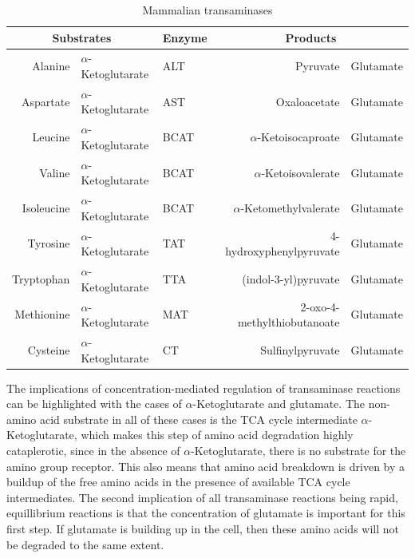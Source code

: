 \documentclass{tufte-handout}
\begin{document}
\begin{table}[b]
\centering
\caption{Mammalian transaminases}
\label{tab:transaminases}
\begin{tabular}{@{}rllrl@{}}
\toprule
\multicolumn{2}{c}{\textbf{Substrates}} & \textbf{Enzyme} & \multicolumn{2}{c}{\textbf{Products}}   \\ \midrule
Alanine          & $\alpha$-Ketoglutarate      & ALT             & Pyruvate                    & Glutamate \\
Aspartate        & $\alpha$-Ketoglutarate      & AST             & Oxaloacetate                & Glutamate \\
Leucine          & $\alpha$-Ketoglutarate      & BCAT\nomenclature{BCAT}{Branched-Chain Aminotransferase}\index{Enzymes!BCAT}            & $\alpha$-Ketoisocaproate           & Glutamate \\
Valine           & $\alpha$-Ketoglutarate      & BCAT            & $\alpha$-Ketoisovalerate           & Glutamate \\
Isoleucine       & $\alpha$-Ketoglutarate      & BCAT            & $\alpha$-Ketomethylvalerate        & Glutamate \\
Tyrosine         & $\alpha$-Ketoglutarate      & TAT             & 4-hydroxyphenylpyruvate     & Glutamate \\
Tryptophan       & $\alpha$-Ketoglutarate      & TTA             & (indol-3-yl)pyruvate        & Glutamate \\
Methionine       & $\alpha$-Ketoglutarate      & MAT             & 2-oxo-4-methylthiobutanoate & Glutamate \\
Cysteine         & $\alpha$-Ketoglutarate      & CT              & Sulfinylpyruvate            & Glutamate \\ \bottomrule
\end{tabular}
\end{table}

The implications of concentration-mediated regulation of transaminase reactions can be highlighted with the cases of $\alpha$-Ketoglutarate and glutamate.  The non-amino acid substrate in all of these cases is the TCA cycle intermediate $\alpha$-Ketoglutarate, which makes this step of amino acid degradation highly cataplerotic, since in the absence of $\alpha$-Ketoglutarate, there is no substrate for the amino group receptor.  This also means that amino acid breakdown is driven by a buildup of the free amino acids in the presence of available TCA cycle intermediates.  The second implication of all transaminase reactions being rapid, equillibrium reactions is that the concentration of glutamate is important for this first step.  If glutamate is building up in the cell, then these amino acids will not be degraded to the same extent.
\end{document}
